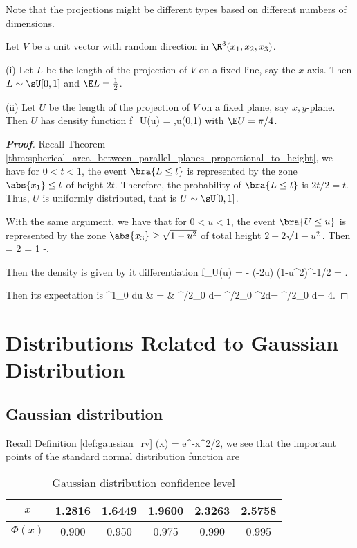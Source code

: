 Note that the projections might be different types based on different numbers of dimensions.

\begin{proposition}
Let $V$ be a unit vector with random direction in $\R^3(x_1,x_2,x_3)$.
\ben
\item [(i)] Let $L$ be the length of the projection of $V$ on a fixed line, say the $x$-axis. Then $L\sim \sU[0,1]$ and $\E L = \frac 12$.
\item [(ii)] Let $U$ be the length of the projection of $V$ on a fixed plane, say $x,y$-plane. Then $U$ has density function
\be
f_U(u) = ,\qquad u\in (0,1)
\ee
with $\E U =\pi/4$.
\een
\end{proposition}

\begin{proof}[\bf Proof]
Recall Theorem \ref{thm:spherical_area_between_parallel_planes_proportional_to_height}, we have for $0<t<1$, the event $\bra{L\leq t}$ is represented by the zone $\abs{x_1}\leq t$ of height $2t$. Therefore, the probability of $\bra{L\leq t}$ is $2t/2 = t$. Thus, $U$ is uniformly distributed, that is $U \sim \sU[0,1]$.

With the same argument, we have that for $0<u<1$, the event $\bra{U\leq u}$ is represented by the zone $\abs{x_3} \geq \sqrt{1-u^2}$ of total height $2-2\sqrt{1-u^2}$. Then
\be
\pro{} = 2 = 1 -.
\ee

Then the density is given by it differentiation
\be
f_U(u) = -  \cdot (-2u) (1-u^2)^{-1/2} =  .
\ee

Then its expectation is
\beast
\int^1_0 du & = & \int^{\pi/2}_0 \frac{\sin^2\theta}{\cos \theta} d\sin\theta = \int^{\pi/2}_0 \sin^2\theta d\theta = \int^{\pi/2}_0  d\theta = \frac {\pi}4.
\eeast
\end{proof}

\section{Distributions Related to Gaussian Distribution}

\subsection{Gaussian distribution}

Recall Definition \ref{def:gaussian_rv}
\be
\phi(x) = e^{-x^2/2},
\ee
we see that the important points of the standard normal distribution function are
\begin{table}[hp]\label{tab:guassian_distribution_confidence_level}
\caption{Gaussian distribution confidence level}
\begin{center}
\begin{tabular}{cccccc}
$x$ & 1.2816 & 1.6449 & 1.9600 & 2.3263 & 2.5758 \\
\hline
$\Phi(x)$ & 0.900 & 0.950 & 0.975 & 0.990 & 0.995\\
\end{tabular}
\end{center}
\end{table}

